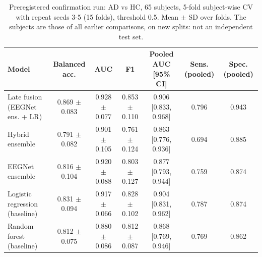 \begin{table}[!t]
\centering
\footnotesize
\caption{Preregistered confirmation run: AD vs HC, 65 subjects, 5-fold subject-wise CV with repeat seeds 3-5 (15 folds), threshold 0.5. Mean $\pm$ SD over folds. The subjects are those of all earlier comparisons, on new splits: not an independent test set.}
\label{tab:table1_main_results}
\begin{tabular}{lcccccc}
\toprule
Model & Balanced acc. & AUC & F1 & Pooled AUC [95\% CI] & Sens. (pooled) & Spec. (pooled) \\
\midrule
Late fusion (EEGNet ens. + LR) & 0.869 $\pm$ 0.083 & 0.928 $\pm$ 0.077 & 0.853 $\pm$ 0.110 & 0.906 [0.833, 0.968] & 0.796 & 0.943 \\
Hybrid ensemble & 0.791 $\pm$ 0.082 & 0.901 $\pm$ 0.105 & 0.761 $\pm$ 0.124 & 0.863 [0.776, 0.936] & 0.694 & 0.885 \\
EEGNet ensemble & 0.816 $\pm$ 0.104 & 0.920 $\pm$ 0.088 & 0.803 $\pm$ 0.127 & 0.877 [0.793, 0.944] & 0.759 & 0.874 \\
Logistic regression (baseline) & 0.831 $\pm$ 0.094 & 0.917 $\pm$ 0.066 & 0.828 $\pm$ 0.102 & 0.904 [0.831, 0.962] & 0.787 & 0.874 \\
Random forest (baseline) & 0.812 $\pm$ 0.075 & 0.880 $\pm$ 0.086 & 0.812 $\pm$ 0.087 & 0.868 [0.769, 0.946] & 0.769 & 0.862 \\
\bottomrule
\end{tabular}
\end{table}
